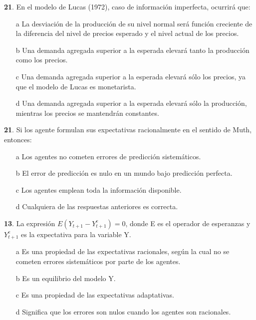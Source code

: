 \documentclass{nuevotema}
\begin{document}

\textbf{21}. En el modelo de Lucas (1972), caso de información imperfecta, ocurrirá que:

\begin{enumerate}
	\item[a] La desviación de la producción de su nivel normal será función creciente de la diferencia del nivel de precios esperado y el nivel actual de los precios.
	\item[b] Una demanda agregada superior a la esperada elevará tanto la producción como los precios.
	\item[c] Una demanda agregada superior a la esperada elevará sólo los precios, ya que el modelo de Lucas es monetarista.
	\item[d] Una demanda agregada superior a la esperada elevará sólo la producción, mientras los precios se mantendrán constantes.
\end{enumerate}

\textbf{21}. Si los agente formulan sus expectativas racionalmente en el sentido de Muth, entonces:

\begin{enumerate}
	\item[a] Los agentes no cometen errores de predicción sistemáticos.
	\item[b] El error de predicción es nulo en un mundo bajo predicción perfecta.
	\item[c] Los agentes emplean toda la información disponible.
	\item[d] Cualquiera de las respuestas anteriores es correcta.
\end{enumerate}


\textbf{13}. La expresión $E(Y_{t+1} - Y^e_{t+1}) = 0$, donde E es el operador de esperanzas y $Y^e_{t+1}$ es la expectativa para la variable Y.

\begin{enumerate}
	\item[a] Es una propiedad de las expectativas racionales, según la cual no se cometen errores sistemáticos por parte de los agentes.
	\item[b] Es un equilibrio del modelo Y.
	\item[c] Es una propiedad de las expectativas adaptativas.
	\item[d] Significa que los errores son nulos cuando los agentes son racionales.
\end{enumerate}
\end{document}
